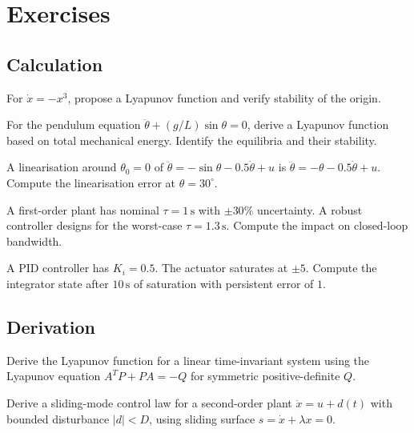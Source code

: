 \section{Exercises}

\subsection*{Calculation}

\begin{exercise}
For $\dot{x} = -x^3$, propose a Lyapunov function and verify stability of the origin.
\end{exercise}

\begin{exercise}
For the pendulum equation $\ddot{\theta} + (g/L)\sin\theta = 0$, derive a Lyapunov function based on total mechanical energy. Identify the equilibria and their stability.
\end{exercise}

\begin{exercise}
A linearisation around $\theta_0 = 0$ of $\ddot{\theta} = -\sin\theta - 0.5\dot{\theta} + u$ is $\ddot{\theta} = -\theta - 0.5\dot{\theta} + u$. Compute the linearisation error at $\theta = 30^\circ$.
\end{exercise}

\begin{exercise}
A first-order plant has nominal $\tau = 1\,\text{s}$ with $\pm 30\%$ uncertainty. A robust controller designs for the worst-case $\tau = 1.3\,\text{s}$. Compute the impact on closed-loop bandwidth.
\end{exercise}

\begin{exercise}
A PID controller has $K_i = 0.5$. The actuator saturates at $\pm 5$. Compute the integrator state after $10\,\text{s}$ of saturation with persistent error of $1$.
\end{exercise}

\subsection*{Derivation}

\begin{exercise}
Derive the Lyapunov function for a linear time-invariant system using the Lyapunov equation $A^T P + P A = -Q$ for symmetric positive-definite $Q$.
\end{exercise}

\begin{exercise}
Derive a sliding-mode control law for a second-order plant $\ddot{x} = u + d(t)$ with bounded disturbance $|d| < D$, using sliding surface $s = \dot{x} + \lambda x = 0$.
\end{exercise}

